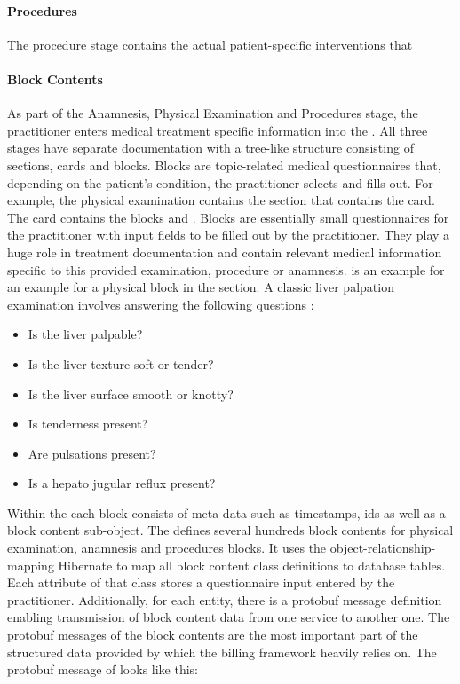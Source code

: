 \paragraph{Procedures}
The procedure stage contains the actual patient-specific interventions that \todo

\paragraph{Block Contents}
As part of the Anamnesis, Physical Examination and Procedures stage,
the practitioner enters medical treatment specific information into the \AVS.
All three stages have separate documentation with a tree-like structure consisting of sections, cards and blocks.
Blocks are topic-related medical questionnaires that, depending on the patient's condition, the practitioner selects and fills out.
For example, the physical examination contains the section  that contains the  card.
The  card contains the blocks  and .
Blocks are essentially small questionnaires for the practitioner with input fields to be filled out by the practitioner.
They play a huge role in treatment documentation and contain relevant medical information specific to this provided examination, procedure or anamnesis.
 is an example for an example for a physical block in the  section.
A classic liver palpation examination involves answering the following questions \cite{wolf1990evaluation}:
\begin{itemize}
    \item Is the liver palpable?
    \item Is the liver texture soft or tender?
    \item Is the liver surface smooth or knotty?
    \item Is tenderness present?
    \item Are pulsations present?
    \item Is a hepato jugular reflux present?
\end{itemize}
Within the \AVS each block consists of meta-data such as timestamps, ids as well as a block content sub-object.
The \AVS defines several hundreds block contents for physical examination, anamnesis and procedures blocks.
It uses the object-relationship-mapping Hibernate to map all block content class definitions to database tables.
Each attribute of that class stores a questionnaire input entered by the practitioner.
Additionally, for each entity, there is a protobuf message definition enabling transmission of block content data from one service
to another one.
The protobuf messages of the block contents are the most important part of the structured data provided by \AV which the billing framework heavily relies on.
The protobuf message of  looks like this:



